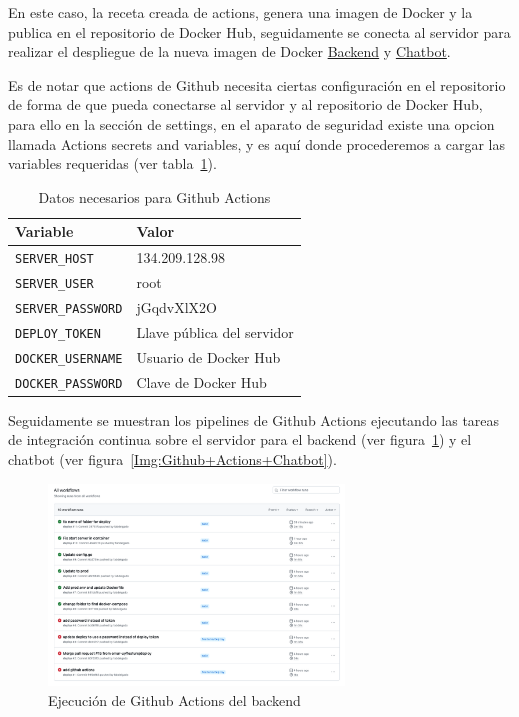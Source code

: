 En este caso, la receta creada de actions, genera una imagen de Docker y la publica en el repositorio de Docker Hub, seguidamente se conecta al servidor para realizar el despliegue de la nueva imagen de Docker \href{https://hub.docker.com/repository/docker/fabdelgado/api-backend-emur}{Backend} y \href{https://hub.docker.com/repository/docker/fabdelgado/api-chatbot-emur/general}{Chatbot}.

Es de notar que actions de Github necesita ciertas configuración en el repositorio de forma de que pueda conectarse al servidor y al repositorio de Docker Hub, para ello en la sección de settings, en el aparato de seguridad existe una opcion llamada Actions secrets and variables, y es aquí donde procederemos a cargar las variables requeridas (ver tabla~\ref{tab:requisitos-actions}).

\begin{table}[H]
\centering
\begin{tabular}{ll}
\toprule
Variable                     & Valor                           \\
\midrule
\texttt{SERVER\_HOST}       & 134.209.128.98              \\
\texttt{SERVER\_USER}      & root             \\
\texttt{SERVER\_PASSWORD}      & jGqdvXlX2O             \\
\texttt{DEPLOY\_TOKEN}      & Llave pública del servidor             \\
\texttt{DOCKER\_USERNAME}      &  Usuario de Docker Hub      \\
\texttt{DOCKER\_PASSWORD}      & Clave de Docker Hub                \\
\bottomrule
\end{tabular}
\caption{Datos necesarios para Github Actions}
\label{tab:requisitos-actions}
\end{table}

Seguidamente se muestran los pipelines de Github Actions ejecutando las tareas de integración continua sobre el servidor para el backend (ver figura~\ref{Img:Github+Actions+Backend}) y el chatbot (ver figura~\ref{Img:Github+Actions+Chatbot}).

\begin{figure}[h]
    \centering
    \includegraphics[width=0.7\textwidth]{img/github/ci_backend.png}
    \caption{Ejecución de Github Actions del backend} \label{Img:Github+Actions+Backend}
\end{figure} 

